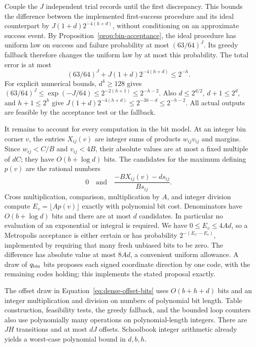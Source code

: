 Couple the $J$ independent trial records until the first discrepancy.
This bounds the difference between the implemented first-success
procedure and its ideal counterpart by
$J(1+d)2^{-4(h+d)}$, without conditioning on an approximate success event.
By Proposition~\ref{prop:bin-acceptance}, the ideal procedure has uniform
law on success and failure probability at most $(63/64)^J$.  Its greedy
fallback therefore changes the uniform law by at most this probability.
The total error is at most
\begin{equation}\label{eq:dense-total-error}
 (63/64)^J+J(1+d)2^{-4(h+d)}\le2^{-h}.
\end{equation}
For explicit numerical bounds, $d^4\ge128$ gives
$(63/64)^J\le\exp(-J/64)\le2^{-2(h+1)}\le2^{-h-2}$.
Also $d\le2^{d/2}$, $d+1\le2^d$, and $h+1\le2^h$ give
$J(1+d)2^{-4(h+d)}\le2^{-3h-d}\le2^{-h-2}$.
All actual outputs are feasible by the acceptance test or the fallback.

It remains to account for every computation in the bit model.
At an integer bin corner $v$, the entries $X_{ij}(v)$ are integer sums
of products $w_{ij}v_{ij}$ and margins.  Since $w_{ij}<C/B$ and
$v_{ij}<4B$, their absolute values are at most a fixed multiple of $dC$;
they have $O(b+\log d)$ bits.  The candidates for the maximum defining
$p(v)$ are the rational numbers
\[
 0\quad\text{and}\quad
 \frac{-BX_{ij}(v)-ds_{ij}}{Bs_{ij}}.
\]
Cross multiplication, comparison, multiplication by $A$, and integer
division compute $E_v=\lfloor Ap(v)\rfloor$ exactly with polynomial bit
cost.  Denominators have $O(b+\log d)$ bits and there are at most $d$
candidates.  In particular no evaluation of an exponential or integral
is required.  We have $0\le E_v\le4Ad$, so a Metropolis acceptance is
either certain or has probability $2^{-(E_{v'}-E_v)}$, implemented by
requiring that many fresh unbiased bits to be zero.  The difference has
absolute value at most $8Ad$, a convenient uniform allowance.  A draw
of $q_{\rm bin}$ bits proposes each signed coordinate direction by one
code, with the remaining codes holding; this implements the stated
proposal exactly.

The offset draw in Equation~\eqref{eq:dense-offset-bits} uses
$O(b+h+d)$ bits and an integer multiplication and division on numbers
of polynomial bit length.  Table construction, feasibility tests, the
greedy fallback, and the bounded loop counters also use polynomially
many operations on polynomial-length integers.  There are $JH$
transitions and at most $dJ$ offsets.  Schoolbook integer arithmetic
already yields a worst-case polynomial bound in $d,b,h$.

